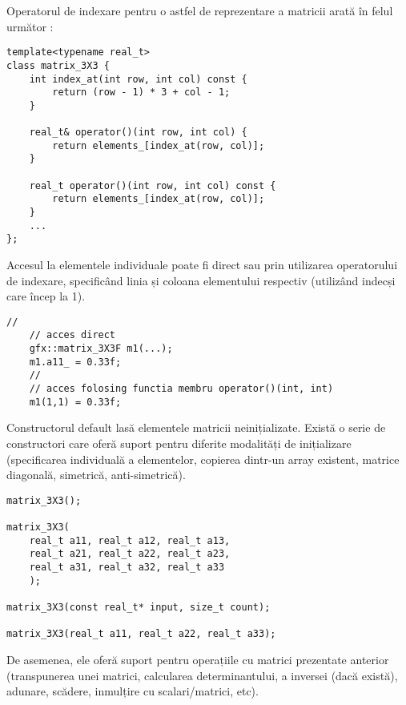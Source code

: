 Operatorul de indexare pentru o astfel de reprezentare a matricii arată în felul
următor :
\begin{lstlisting}[title={Cod C++}, 
    xleftmargin=2pt,
    abovecaptionskip=2pt,
    belowcaptionskip=2pt,
    frame=single]
template<typename real_t>
class matrix_3X3 {
    int index_at(int row, int col) const {
        return (row - 1) * 3 + col - 1;
    }

    real_t& operator()(int row, int col) {
        return elements_[index_at(row, col)];
    }

    real_t operator()(int row, int col) const {
        return elements_[index_at(row, col)];
    }
    ...
};
\end{lstlisting}

Accesul la elementele individuale poate fi direct sau prin utilizarea 
operatorului de indexare, specificând linia și coloana elementului respectiv 
(utilizând indecși care încep la 1).
\begin{lstlisting}[title={Cod C++}, 
    xleftmargin=2pt,
    abovecaptionskip=2pt,
    belowcaptionskip=2pt,
    frame=single]
    //
    // acces direct
    gfx::matrix_3X3F m1(...);
    m1.a11_ = 0.33f;
    //
    // acces folosing functia membru operator()(int, int)
    m1(1,1) = 0.33f;
\end{lstlisting}

Constructorul default lasă elementele matricii neinițializate. Există o serie de 
constructori care oferă suport pentru diferite modalități de inițializare 
(specificarea individuală a elementelor, copierea dintr-un array existent, 
matrice diagonală, simetrică, anti-simetrică).
\begin{lstlisting}[title={Cod C++}, 
    xleftmargin=2pt,
    abovecaptionskip=2pt,
    belowcaptionskip=2pt,
    frame=single]
matrix_3X3();

matrix_3X3(
    real_t a11, real_t a12, real_t a13,
    real_t a21, real_t a22, real_t a23,
    real_t a31, real_t a32, real_t a33
    );

matrix_3X3(const real_t* input, size_t count);

matrix_3X3(real_t a11, real_t a22, real_t a33);
\end{lstlisting}
 
De asemenea, ele oferă suport pentru operațiile cu matrici prezentate
anterior (transpunerea unei matrici, calcularea determinantului, a inversei
(dacă există), adunare, scădere, inmulțire cu scalari/matrici, etc).


